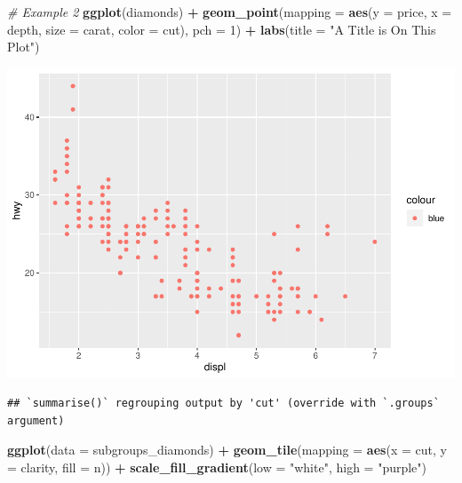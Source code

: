 \documentclass[
]{book}
\newenvironment{Shaded}{\begin{snugshade}}{\end{snugshade}}
\newcommand{\CommentTok}[1]{\textcolor[rgb]{0.56,0.35,0.01}{\textit{#1}}}
\newcommand{\DataTypeTok}[1]{\textcolor[rgb]{0.13,0.29,0.53}{#1}}
\newcommand{\DecValTok}[1]{\textcolor[rgb]{0.00,0.00,0.81}{#1}}
\newcommand{\KeywordTok}[1]{\textcolor[rgb]{0.13,0.29,0.53}{\textbf{#1}}}
\newcommand{\NormalTok}[1]{#1}
\newcommand{\OperatorTok}[1]{\textcolor[rgb]{0.81,0.36,0.00}{\textbf{#1}}}
\newcommand{\StringTok}[1]{\textcolor[rgb]{0.31,0.60,0.02}{#1}}
\begin{document}
\begin{Shaded}
\begin{Highlighting}[]
\CommentTok{# Example 2}
\KeywordTok{ggplot}\NormalTok{(diamonds) }\OperatorTok{+}\StringTok{ }\KeywordTok{geom_point}\NormalTok{(}\DataTypeTok{mapping =} \KeywordTok{aes}\NormalTok{(}\DataTypeTok{y =}\NormalTok{ price,}
    \DataTypeTok{x =}\NormalTok{ depth, }\DataTypeTok{size =}\NormalTok{ carat,}
    \DataTypeTok{color =}\NormalTok{ cut), }\DataTypeTok{pch =} \DecValTok{1}\NormalTok{) }\OperatorTok{+}
\StringTok{    }\KeywordTok{labs}\NormalTok{(}\DataTypeTok{title =} \StringTok{"A Title is On This Plot"}\NormalTok{)}
\end{Highlighting}
\end{Shaded}

\includegraphics{_main_files/figure-latex/unnamed-chunk-256-2.pdf}

\begin{Shaded}
\end{Shaded}

\begin{verbatim}
## `summarise()` regrouping output by 'cut' (override with `.groups` argument)
\end{verbatim}

\begin{Shaded}
\begin{Highlighting}[]
\KeywordTok{ggplot}\NormalTok{(}\DataTypeTok{data =}\NormalTok{ subgroups_diamonds) }\OperatorTok{+}
\StringTok{    }\KeywordTok{geom_tile}\NormalTok{(}\DataTypeTok{mapping =} \KeywordTok{aes}\NormalTok{(}\DataTypeTok{x =}\NormalTok{ cut,}
        \DataTypeTok{y =}\NormalTok{ clarity,}
        \DataTypeTok{fill =}\NormalTok{ n)) }\OperatorTok{+}
\StringTok{    }\KeywordTok{scale_fill_gradient}\NormalTok{(}\DataTypeTok{low =} \StringTok{"white"}\NormalTok{,}
        \DataTypeTok{high =} \StringTok{"purple"}\NormalTok{)}
\end{Highlighting}
\end{Shaded}
\end{document}
